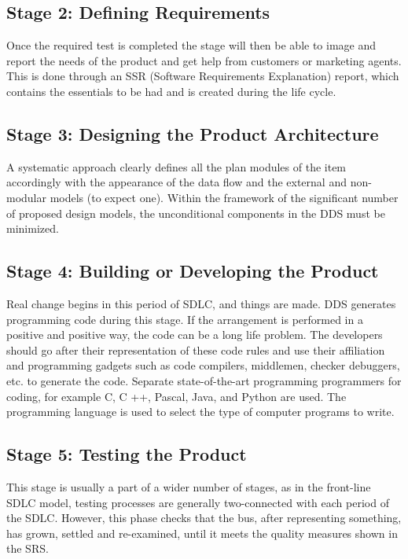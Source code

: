 \documentclass[oneside,12pt]{Classes/VTU}
\begin{document}
    	\subsection{Stage 2: Defining Requirements}
    	Once the required test is completed the stage will then be able to image and report the needs of the product and get help from customers or marketing agents. This is done through an SSR (Software Requirements Explanation) report, which contains the essentials to be had and is created during the life cycle.
    	
    	\subsection{Stage 3: Designing the Product Architecture}
    	A systematic approach clearly defines all the plan modules of the item accordingly with the appearance of the data flow and the external and non-modular models (to expect one). Within the framework of the significant number of proposed design models, the unconditional components in the DDS must be minimized.
    	
    	\subsection{Stage 4: Building or Developing the Product}
    	Real change begins in this period of SDLC, and things are made. DDS generates programming code during this stage. If the arrangement is performed in a positive and positive way, the code can be a long life problem. The developers should go after their representation of these code rules and use their affiliation and programming gadgets such as code compilers, middlemen, checker debuggers, etc. to generate the code. Separate state-of-the-art programming programmers for coding, for example C, C ++, Pascal, Java, and Python are used. The programming language is used to select the type of computer programs to write.
    	
    	\subsection{Stage 5: Testing the Product}
    	This stage is usually a part of a wider number of stages, as in the front-line SDLC model, testing processes are generally two-connected with each period of the SDLC. However, this phase checks that the bus, after representing something, has grown, settled and re-examined, until it meets the quality measures shown in the SRS.
\end{document}
